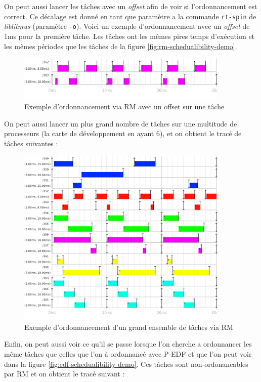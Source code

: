 On peut aussi lancer les tâches avec un \textit{offset} afin de voir si l'ordonnancement est correct. Ce décalage est donné en tant que paramètre a la commande \texttt{rt-spin} de \textit{liblitmus} (paramètre \texttt{-o}). Voici un exemple d'ordonnancement avec un \textit{offset} de 1ms pour la première tâche. Les tâches ont les mêmes pires temps d'exécution et les mêmes périodes que les tâches de la figure \ref{fig:rm-schedualibility-demo}.
\begin{figure}[H]
    \centering
    \includegraphics[width=0.9\textwidth]{Images/RM_OFFSET_SCHED.png}
    \caption{Exemple d'ordonnancement via RM avec un offset sur une tâche}
\end{figure}

On peut aussi lancer un plus grand nombre de tâches sur une multitude de processeurs (la carte de développement en ayant 6), et on obtient le tracé de tâches suivantes : 

\begin{figure}[H]
    \centering
    \includegraphics[width=0.9\textwidth]{Images/RM-bcp.png}
    \caption{Exemple d'ordonnancement d'un grand ensemble de tâches via RM}
\end{figure}


Enfin, on peut aussi voir ce qu'il se passe lorsque l'on cherche a ordonnancer les même tâches que celles que l'on à ordonnancé avec P-EDF et que l'on peut voir dans la figure \ref{fig:edf-schedualibility-demo}. Ces tâches sont non-ordonancables par RM et on obtient le tracé suivant :

